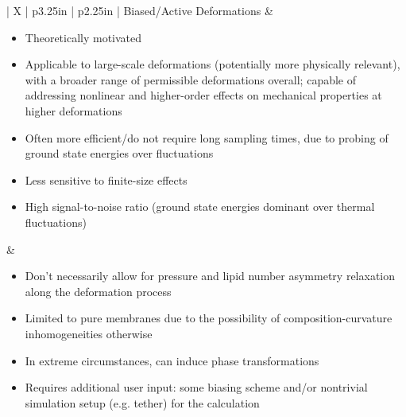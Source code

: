 \documentclass[9pt,bestpractices,pubversion]{livecoms}
\begin{document}
\begin{table}[!htp]
\begin{tabularx}{\linewidth}{| X | p{3.25in} | p{2.25in} |}
Biased/Active Deformations & \begin{minipage}[t]{\linewidth} \begin{itemize}[nosep,after=\strut] \item Theoretically motivated \item Applicable to large-scale deformations (potentially more physically relevant), with a broader range of permissible deformations overall; capable of addressing nonlinear and higher-order effects on mechanical properties at higher deformations ~\cite{Harmandaris2006a} \item Often more efficient/do not require long sampling times, due to probing of ground state energies over fluctuations ~\cite{Bochicchio2016,Harmandaris2006a} \item Less sensitive to finite-size effects ~\cite{Harmandaris2006a} \item High signal-to-noise ratio (ground state energies dominant over thermal fluctuations) ~\cite{Bochicchio2016} \end{itemize} \end{minipage} & \begin{minipage}[t]{\linewidth} \begin{itemize}[nosep,after=\strut] \item Don't necessarily allow for pressure and lipid number asymmetry relaxation along the deformation process ~\cite{Bochicchio2016} \item Limited to pure membranes due to the possibility of composition-curvature inhomogeneities otherwise ~\cite{Bochicchio2016} \item In extreme circumstances, can induce phase transformations ~\cite{Bochicchio2016} \item Requires additional user input: some biasing scheme and/or nontrivial simulation setup (e.g. tether) for the calculation \end{itemize} \end{minipage} \\
\hline
\end{tabularx}
\end{table}
\end{document}
